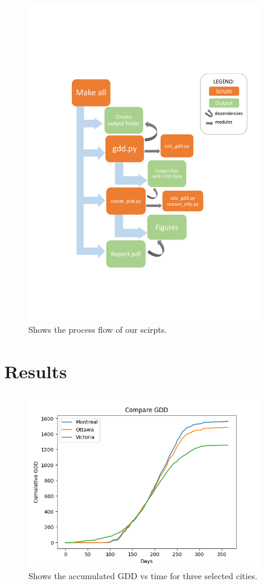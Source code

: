 \documentclass[12pt]{article}
\begin{document}
	\begin{figure}[!htbp]
		\centering
		\includegraphics[width=0.9\textwidth]{./Report/diagram_workflow.pdf} 
		\caption{\scriptsize Shows the process flow of our scirpts.}\label{flowplot}		  
	\end{figure}


\pagebreak

\section{Results}
	\begin{figure}[!htbp]
		\centering
		\includegraphics[width=0.9\textwidth]{./Output/CumulativeGDD.png} 
		\caption{\scriptsize Shows the accumulated GDD vs time for three selected cities.}\label{GDDplot}		  
	\end{figure}
\end{document}
